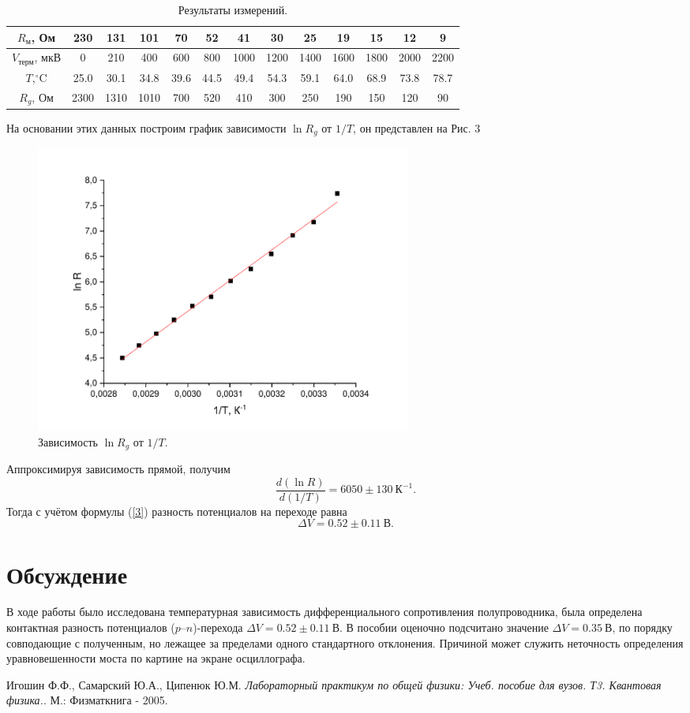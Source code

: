 \documentclass[a4paper,12pt]{article}
\theoremstyle{definition}
\begin{document}
\begin{table}[h]
\begin{tabular}{|c|c|c|c|c|c|c|c|c|c|c|c|c|}
\hline
$R_\text{м}$, Ом       & 230  & 131  & 101  & 70   & 52   & 41   & 30   & 25   & 19   & 15   & 12   & 9    \\ \hline
$V_{\text{терм}}$, мкВ        & 0    & 210  & 400  & 600  & 800  & 1000 & 1200 & 1400 & 1600 & 1800 & 2000 & 2200 \\ \hline
$T$,$^{\circ}\text{C}$ & 25.0 & 30.1 & 34.8 & 39.6 & 44.5 & 49.4 & 54.3 & 59.1 & 64.0 & 68.9 & 73.8 & 78.7 \\ \hline
$R_g$, Ом              & 2300 & 1310 & 1010 & 700  & 520  & 410  & 300  & 250  & 190  & 150  & 120  & 90   \\ \hline
\end{tabular}
\centering
\caption{Результаты измерений.}
\end{table}
На основании этих данных построим график зависимости $\ln R_g$ от $1/T$, он представлен на Рис. 3
\begin{figure}[h]
\includegraphics[width = 0.6\textwidth]{1.pdf}
\centering
\caption{Зависимость $\ln R_g$ от $1/T$.}
\end{figure}
Аппроксимируя зависимость прямой, получим 
\[\dfrac{d(\ln R)}{d(1/T)} = 6050 \pm 130~\text{К}^{-1}.\]
Тогда с учётом формулы (\ref{3}) разность потенциалов на переходе равна
\[\Delta V = 0.52 \pm 0.11~\text{В}.\]
\section*{Обсуждение}
В ходе работы было исследована температурная зависимость дифференциального сопротивления полупроводника, была определена контактная разность потенциалов ($p$--$n$)-перехода $\Delta V = 0.52 \pm 0.11~\text{В}$. В пособии \cite{laba} оценочно подсчитано значение $\Delta V = 0.35~\text{В}$, по порядку совподающие с полученным, но лежащее за пределами одного стандартного отклонения. Причиной может служить неточность определения уравновешенности моста по картине на экране осциллографа.

\begin{thebibliography}{9}
Игошин Ф.Ф., Самарский Ю.А., Ципенюк Ю.М.
\textit{Лабораторный практикум по общей физики: Учеб. пособие для вузов. Т3. Квантовая физика.}. 
М.: Физматкнига - 2005.
\end{thebibliography}
\end{document}
